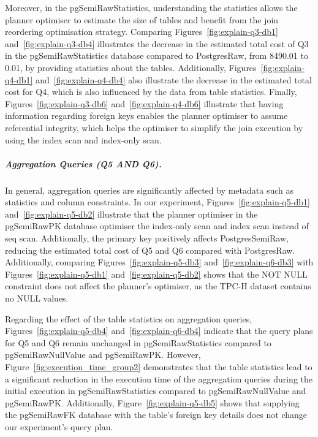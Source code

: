 



Moreover, in the pgSemiRawStatistics, understanding the statistics allows the planner optimiser to estimate the size of tables and benefit from the join reordering optimisation strategy. Comparing Figures~\ref{fig:explain-q3-db1} and~\ref{fig:explain-q3-db4} illustrates the decrease in the estimated total cost of Q3 in the pgSemiRawStatistics database compared to PostgresRaw, from 8490.01 to 0.01, by providing statistics about the tables. Additionally, Figures~\ref{fig:explain-q4-db1} and~\ref{fig:explain-q4-db4} also illustrate the decrease in the estimated total cost for Q4, which is also influenced by the data from table statistics. Finally, Figures~\ref{fig:explain-q3-db6} and~\ref{fig:explain-q4-db6} illustrate that having information regarding foreign keys enables the planner optimiser to assume referential integrity, which helps the optimiser to simplify the join execution by using the index scan and index-only scan.

\subparagraph{Aggregation Queries (Q5 AND Q6).}
In general, aggregation queries are significantly affected by metadata such as statistics and column constraints. In our experiment, Figures~\ref{fig:explain-q5-db1} and~\ref{fig:explain-q5-db2} illustrate that the planner optimiser in the pgSemiRawPK database optimiser the index-only scan and index scan instead of \acrshort{seq scan}. Additionally, the primary key positively affects PostgresSemiRaw, reducing the estimated total cost of Q5 and Q6 compared with PostgresRaw. Additionally, comparing Figures~\ref{fig:explain-q5-db3} and~\ref{fig:explain-q6-db3} with Figures~\ref{fig:explain-q5-db1} and~\ref{fig:explain-q5-db2} shows that the NOT NULL constraint does not affect the planner's optimiser, as the TPC-H dataset contains no NULL values.

Regarding the effect of the table statistics on aggregation queries, Figures~\ref{fig:explain-q5-db4} and~\ref{fig:explain-q6-db4} indicate that the query plans for Q5 and Q6 remain unchanged in pgSemiRawStatistics compared to pgSemiRawNullValue and pgSemiRawPK. However, Figure~\ref{fig:execution_time_group2} demonstrates that the table statistics lead to a significant reduction in the execution time of the aggregation queries during the initial execution in pgSemiRawStatistics compared to pgSemiRawNullValue and pgSemiRawPK. Additionally, Figure~\ref{fig:explain-q5-db5} shows that supplying the pgSemiRawFK database with the table's foreign key details does not change our experiment's query plan.


